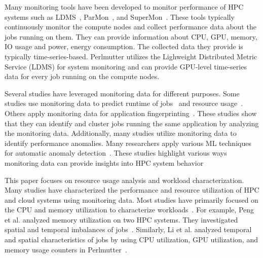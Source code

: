 
Many monitoring tools have been developed to monitor performance of HPC
systems such as LDMS~\cite{ldms}, ParMon~\cite{parmon}, and
SuperMon~\cite{supermon}.  These tools typically continuously
monitor the compute nodes and collect performance data about the jobs running
on them.  They can provide information about CPU, GPU, memory, IO usage and
power, energy consumption. The collected data they provide is typically
time-series-based.
Perlmutter utilizes the Lighweight Distributed Metric Service (LDMS) for system
monitoring and can provide GPU-level time-series data for every job
running on the compute nodes.

Several studies have leveraged monitoring data for different purposes. Some
studies use monitoring data to predict runtime of
jobs~\cite{7776517, aaziz2018modeling} and resource
usage~\cite{emeras2017evalix, sirbu2016power}.  Others apply monitoring
data for  application fingerprinting~\cite{li2023arcode, ates2018taxonomist}.
These studies show that they can identify and cluster jobs running the same
application by analyzing the monitoring data. Additionally, many studies
utilize monitoring data to identify performance anomalies. Many researchers
apply various ML techniques for automatic anomaly
detection~\cite{proctor, ruad, ozer2020characterizing}.  These studies
highlight various ways monitoring data can provide insights into
HPC system behavior ~\cite{netti2021conceptual, netti2022operational}

This paper focuses on resource usage analysis and workload characterization.
Many studies have characterized the performance and resource utilization of HPC
and cloud systems using monitoring data. Most studies have primarily
focused on the CPU and memory utilization to characterize
workloads~\cite{amvrosiadis2018diversity, cortez2017resource,
    shen2015statistical, chen2010analysis, mishra2010towards,
    reiss2012heterogeneity, ren2012workload, di2012characterization}. For example,
Peng et al. analyzed memory utilization on two HPC systems. They investigated
spatial and temporal imbalances of jobs~\cite{peng2021holistic}.  Similarly, Li
et al. analyzed temporal and spatial characteristics of jobs
by using CPU utilization, GPU utilization, and memory usage counters
in Perlmutter~\cite{li2023analyzing}.


